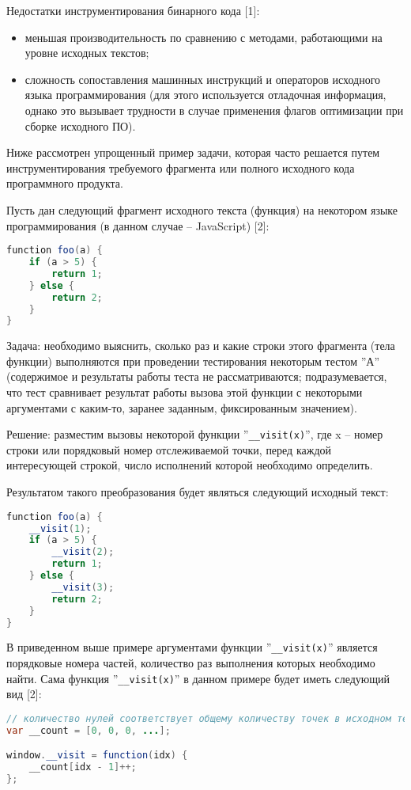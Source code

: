 Недостатки инструментирования бинарного кода [1]:
\begin{itemize}
  \item меньшая производительность по сравнению с методами, работающими на уровне исходных текстов;
  \item сложность сопоставления машинных инструкций и операторов исходного языка программирования (для этого используется отладочная информация, однако это вызывает трудности в случае применения флагов оптимизации при сборке исходного ПО).
\end{itemize}

Ниже рассмотрен упрощенный пример задачи, которая часто решается путем инструментирования требуемого фрагмента или полного исходного кода программного продукта.

Пусть дан следующий фрагмент исходного текста (функция) на некотором языке программирования (в данном случае -- JavaScript) [2]:
\begin{lstlisting}[frame=single, language=Java]
function foo(a) {
    if (a > 5) {
        return 1;
    } else {
        return 2;
    }
}
\end{lstlisting}

Задача: необходимо выяснить, сколько раз и какие строки этого фрагмента (тела функции) выполняются при проведении тестирования некоторым тестом ''А'' (содержимое и результаты работы теста не рассматриваются; подразумевается, что тест сравнивает результат работы вызова этой функции с некоторыми аргументами с каким-то, заранее заданным, фиксированным значением).

Решение: разместим вызовы некоторой функции ''\lstinline{__visit(x)}'', где x -- номер строки или порядковый номер отслеживаемой точки, перед каждой интересующей строкой, число исполнений которой необходимо определить.

Результатом такого преобразования будет являться следующий исходный текст:
\begin{lstlisting}[frame=single, language=Java]
function foo(a) {
    __visit(1);
    if (a > 5) {
        __visit(2);
        return 1;
    } else {
        __visit(3);
        return 2;
    }
}
\end{lstlisting}

В приведенном выше примере аргументами функции ''\lstinline{__visit(x)}'' является порядковые номера частей, количество раз выполнения которых необходимо найти.
Сама функция ''\lstinline{__visit(x)}'' в данном примере будет иметь следующий вид [2]:
\begin{lstlisting}[frame=single, language=Java]
// количество нулей соответствует общему количеству точек в исходном тексте, число исполнений которых необходимо измерить
var __count = [0, 0, 0, ...];

window.__visit = function(idx) {
    __count[idx - 1]++;
};
\end{lstlisting}

